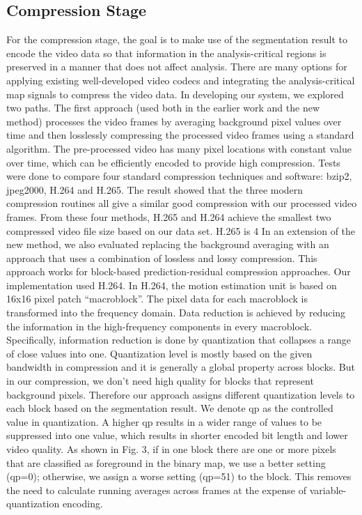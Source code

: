 \subsection{Compression Stage}

For the compression stage, the goal is to make use of the segmentation result to encode the video data so that information in the analysis-critical regions is preserved in a manner that does not affect analysis. There are many options for applying existing well-developed video codecs and integrating the analysis-critical map signals to compress the video data. In developing our system, we explored two paths. The first approach (used both in the earlier work and the new method) processes the video frames by averaging background pixel values over time and then losslessly compressing the processed video frames using a standard algorithm. The pre-processed video has many pixel locations with constant value over time, which can be efficiently encoded to provide high compression. Tests were done to compare four standard compression techniques and software: bzip2, jpeg2000, H.264 and H.265. The result showed that the three modern compression routines all give a similar good compression with our processed video frames. From these four methods, H.265 and H.264 achieve the smallest two compressed video file size based on our data set. H.265 is 4%
In an extension of the new method, we also evaluated replacing the background averaging with an approach that uses a combination of lossless and lossy compression. This approach works for block-based prediction-residual compression approaches. Our implementation used H.264. In H.264, the motion estimation unit is based on 16x16 pixel patch “macroblock”. The pixel data for each macroblock is transformed into the frequency domain. Data reduction is achieved by reducing the information in the high-frequency components in every macroblock. Specifically, information reduction is done by quantization that collapses a range of close values into one. Quantization level is mostly based on the given bandwidth in compression and it is generally a global property across blocks. But in our compression, we don’t need high quality for blocks that represent background pixels. Therefore our approach assigns different quantization levels to each block based on the segmentation result. We denote qp as the controlled value in quantization. A higher qp results in a wider range of values to be suppressed into one value, which results in shorter encoded bit length and lower video quality. As shown in Fig. 3, if in one block there are one or more pixels that are classified as foreground in the binary map, we use a better setting (qp=0); otherwise, we assign a worse setting (qp=51) to the block. This removes the need to calculate running averages across frames at the expense of variable-quantization encoding.
